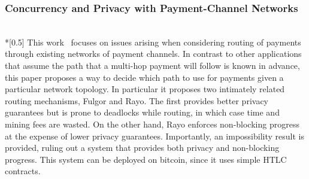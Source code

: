 \subsubsection{Concurrency and Privacy with Payment-Channel Networks} \
\\*[0.5\baselineskip]
  This work~\cite{fulgorrayo} focuses on issues arising when considering routing of
  payments through existing networks of payment channels. In contrast to other
  applications that assume the path that a multi-hop payment will follow is known in
  advance, this paper proposes a way to decide which path to use for payments given a
  particular network topology. In particular it proposes two intimately related routing
  mechanisms, Fulgor and Rayo. The first provides better privacy guarantees but is prone
  to deadlocks while routing, in which case time and mining fees are wasted. On the other
  hand, Rayo enforces non-blocking progress at the expense of lower privacy guarantees.
  Importantly, an impossibility result is provided, ruling out a system that provides both
  privacy and non-blocking progress. This system can be deployed on bitcoin, since it uses
  simple HTLC contracts.
